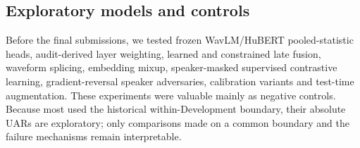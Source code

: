 \subsection{Exploratory models and controls}

Before the final submissions, we tested frozen WavLM/HuBERT pooled-statistic
heads, audit-derived layer weighting, learned and constrained late fusion,
waveform splicing, embedding mixup, speaker-masked supervised contrastive
learning, gradient-reversal speaker adversaries, calibration variants and
test-time augmentation. These experiments were valuable mainly as negative
controls. Because most used the historical within-Development boundary, their
absolute UARs are exploratory; only comparisons made on a common boundary and
the failure mechanisms remain interpretable.
